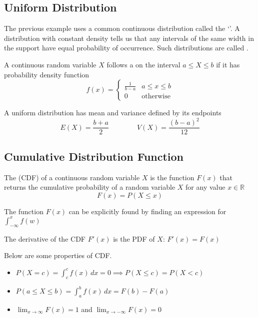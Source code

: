 \subsection{Uniform Distribution}

The previous example uses a common continuous distribution called the `'. A distribution with constant density tells us that any intervals of the same width in the support have equal probability of occurrence. Such distributions are called .

\begin{definition}
    A continuous random variable $X$ follows a  on the interval $a \le X \le b$ if it has probability density function $$f(x) = \begin{cases} \frac{1}{b - a} & a \le x \le b \\ 0 & \text{otherwise} \end{cases}$$ 
    
    A uniform distribution has mean and variance defined by its endpoints $$E(X) = \frac{b + a}{2} \qquad \qquad V(X) = \frac{(b - a)^2}{12}$$
\end{definition}

\subsection{Cumulative Distribution Function}

\begin{definition}
    The  (CDF) of a continuous random variable $X$ is the function $F(x)$ that returns the cumulative probability of a random variable $X$ for any value $x \in \mathbb{R}$ $$F(x) = P(X \le x)$$

    The function $F(x)$ can be explicitly found by finding an expression for $\int_{-\infty}^x f(w)$

    The derivative of the CDF $F'(x)$ is the PDF of $X$: $F'(x) = F(x)$
\end{definition}

\begin{proposition}
    Below are some properties of CDF. 

    \begin{itemize}
        \item $P(X = c) = \int_c^c f(x)\,dx = 0 \implies P(X \le c) = P(X < c)$
        \item $P(a \le X \le b) = \int_a^b f(x) \,dx = F(b) - F(a)$
        \item $\lim_{x\to\infty} F(x) = 1$ and $\lim_{x\to-\infty} F(x) = 0$
    \end{itemize}
\end{proposition}


